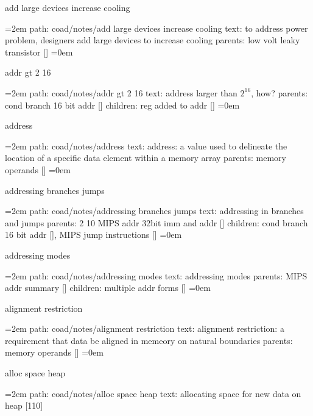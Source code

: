add large devices increase cooling
\smallskip
\par\begingroup
\leftskip=2em
path: coad/notes/add large devices increase cooling
\smallskip
text:  to address power problem, designers add large devices to increase cooling
\smallskip
parents:  low volt leaky transistor []
\smallskip
\leftskip=0em
\par\endgroup
\bigskip
{}
addr gt 2 16
\smallskip
\par\begingroup
\leftskip=2em
path: coad/notes/addr gt 2 16
\smallskip
text:  address larger than $2^{16}$, how?
\smallskip
parents:  cond branch 16 bit addr []
\smallskip
children: reg added to addr []
\smallskip
\leftskip=0em
\par\endgroup
\bigskip
{}
address
\smallskip
\par\begingroup
\leftskip=2em
path: coad/notes/address
\smallskip
text:  address: a value used to delineate the location of a specific data element within a memory array
\smallskip
parents:  memory operands []
\smallskip
\leftskip=0em
\par\endgroup
\bigskip
{}
addressing branches jumps
\smallskip
\par\begingroup
\leftskip=2em
path: coad/notes/addressing branches jumps
\smallskip
text:  addressing in branches and jumps
\smallskip
parents:  2 10 MIPS addr 32bit imm and addr []
\smallskip
children: cond branch 16 bit addr [], MIPS jump instructions []
\smallskip
\leftskip=0em
\par\endgroup
\bigskip
{}
addressing modes
\smallskip
\par\begingroup
\leftskip=2em
path: coad/notes/addressing modes
\smallskip
text:  addressing modes
\smallskip
parents:  MIPS addr summary []
\smallskip
children: multiple addr forms []
\smallskip
\leftskip=0em
\par\endgroup
\bigskip
{}
alignment restriction
\smallskip
\par\begingroup
\leftskip=2em
path: coad/notes/alignment restriction
\smallskip
text:  alignment restriction: a requirement that data be aligned in memeory on natural boundaries
\smallskip
parents:  memory operands []
\smallskip
\leftskip=0em
\par\endgroup
\bigskip
{}
alloc space heap
\smallskip
\par\begingroup
\leftskip=2em
path: coad/notes/alloc space heap
\smallskip
text:  allocating space for new data on heap [110]
